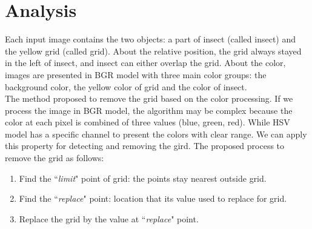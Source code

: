 \section{Analysis}
Each input image contains the two objects: a part of insect (called insect) and the yellow grid (called grid). About the relative position, the grid always stayed in the left of insect, and insect can either overlap the grid. About the color, images are presented in BGR model with three main color groups: the background color, the yellow color of grid and the color of insect.\\[0.2cm]
The method proposed to remove the grid based on the color processing. If we process the image in BGR model, the algorithm may be complex because the color at each pixel is combined of three values (blue, green, red). While HSV model has a specific channel to present the colors with clear range. We can apply this property for detecting and removing the gird. The proposed process to remove  the grid as follows:
\begin{enumerate}
\item Find the ``\textit{limit}" point of grid: the points stay nearest outside grid.
\item Find the ``\textit{replace}" point: location that its value used to replace for grid.
\item Replace the grid by the value at ``\textit{replace}" point.
\end{enumerate}
